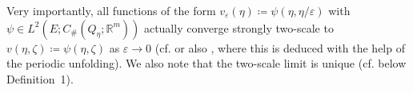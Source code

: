 \documentclass[reqno,11pt]{amsart}
\numberwithin{equation}{section}
\theoremstyle{thmlemcorr}
\numberwithin{theorem}{section}
\theoremstyle{thmlemcorr*}
\theoremstyle{defi}
\theoremstyle{remexample}
\theoremstyle{ass}
\newcommand{\R}{\mathbb{R}}
\newcommand{\1}{\mathds{1}}
\newcommand{\veps}{\varepsilon}
\begin{document}

Very importantly, all functions of the form \(v_\veps(\eta)\coloneqq \psi(\eta,\eta/\veps)\) with \(\psi \in L^2(E;C_{\#}(Q_\eta;\R^m))\) actually converge strongly two-scale to \(v(\eta,\zeta)\coloneqq \psi(\eta,\zeta)\) as $\veps \to 0$ (cf. \cite[Example~1 and Theorem~11]{LNW02} or also \cite{Vi06}, where this is deduced with the help of the periodic unfolding). We also note that the two-scale limit is unique (cf. \cite{LNW02} below Definition~1).
\end{document}
